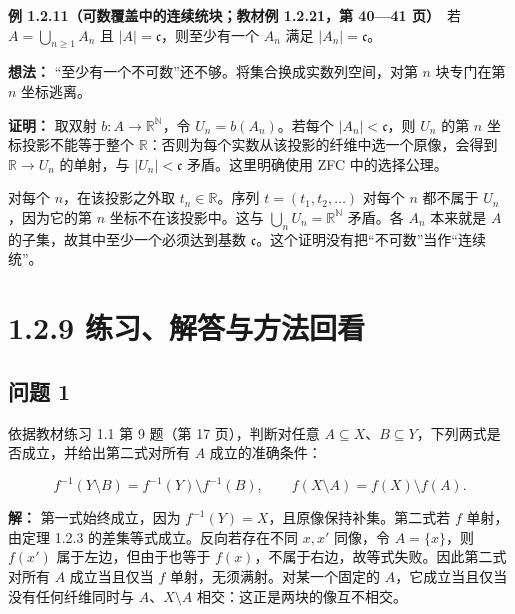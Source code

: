 \documentclass[11pt,a4paper]{article}
\begin{document}
\textbf{例 1.2.11（可数覆盖中的连续统块；教材例 1.2.21，第 40---41
页）}　若 \(A=\bigcup_{n\ge1}A_n\) 且 \(|A|=\mathfrak c\)，则至少有一个
\(A_n\) 满足 \(|A_n|=\mathfrak c\)。

\textbf{想法：} ``至少有一个不可数''还不够。将集合换成实数列空间，对第
\(n\) 块专门在第 \(n\) 坐标逃离。

\textbf{证明：} 取双射 \(b:A\to\mathbb R^{\mathbb N}\)，令
\(U_n=b(A_n)\)。若每个 \(|A_n|<\mathfrak c\)，则 \(U_n\) 的第 \(n\)
坐标投影不能等于整个
\(\mathbb R\)：否则为每个实数从该投影的纤维中选一个原像，会得到
\(\mathbb R\to U_n\) 的单射，与 \(|U_n|<\mathfrak c\) 矛盾。这里明确使用
ZFC 中的选择公理。

对每个 \(n\)，在该投影之外取 \(t_n\in\mathbb R\)。序列
\(t=(t_1,t_2,\ldots)\) 对每个 \(n\) 都不属于 \(U_n\)，因为它的第 \(n\)
坐标不在该投影中。这与 \(\bigcup_nU_n=\mathbb R^{\mathbb N}\) 矛盾。各
\(A_n\) 本来就是 \(A\) 的子集，故其中至少一个必须达到基数
\(\mathfrak c\)。这个证明没有把``不可数''当作``连续统''。

\section[\S{}1.2.9
练习、解答与方法回看]{1.2.9
练习、解答与方法回看}\label{ux7ec3ux4e60ux89e3ux7b54ux4e0eux65b9ux6cd5ux56deux770b}

\subsection{问题 1}\label{ux95eeux9898-1}

依据教材练习 1.1 第 9 题（第 17 页），判断对任意
\(A\subseteq X\)、\(B\subseteq Y\)，下列两式是否成立，并给出第二式对所有
\(A\) 成立的准确条件：

\begin{equation*}
f^{-1}(Y\setminus B)=f^{-1}(Y)\setminus f^{-1}(B),\qquad
f(X\setminus A)=f(X)\setminus f(A).
\tag{1.2.24}
\end{equation*}

\textbf{解：} 第一式始终成立，因为
\(f^{-1}(Y)=X\)，且原像保持补集。第二式若 \(f\) 单射，由定理 1.2.3
的差集等式成立。反向若存在不同 \(x,x'\) 同像，令 \(A=\{x\}\)，则
\(f(x')\) 属于左边，但由于也等于
\(f(x)\)，不属于右边，故等式失败。因此第二式对所有 \(A\) 成立当且仅当
\(f\) 单射，无须满射。对某一个固定的
\(A\)，它成立当且仅当没有任何纤维同时与 \(A\)、\(X\setminus A\)
相交：这正是两块的像互不相交。
\end{document}
